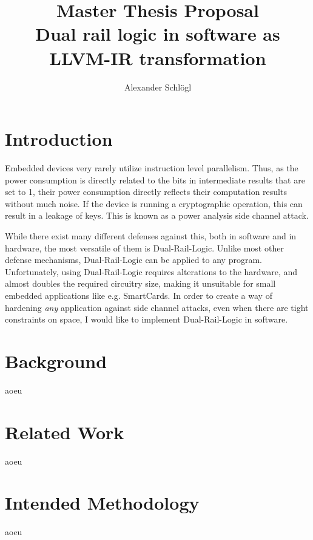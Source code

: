 \documentclass{article}
\title{%
  Master Thesis Proposal\\
  \large Dual rail logic in software as LLVM-IR transformation}
\author{Alexander Schl\"ogl}
\begin{document}
\maketitle

\section{Introduction}
Embedded devices very rarely utilize instruction level parallelism.
Thus, as the power consumption is directly related to the bits in intermediate results that are set to 1, their power consumption directly reflects their computation results without much noise.
If the device is running a cryptographic operation, this can result in a leakage of keys.
This is known as a power analysis side channel attack. \cite{kocher1999differential}

While there exist many different defenses against this, both in software and in hardware, the most versatile of them is Dual-Rail-Logic. \cite{sokolov2005design}
Unlike most other defense mechanisms, Dual-Rail-Logic can be applied to any program.
Unfortunately, using Dual-Rail-Logic requires alterations to the hardware, and almost doubles the required circuitry size, making it unsuitable for small embedded applications like e.g. SmartCards.
In order to create a way of hardening \emph{any} application against side channel attacks, even when there are tight constraints on space, I would like to implement Dual-Rail-Logic in software.

\section{Background}
\label{sec:background}
aoeu

\section{Related Work}
\label{sec:related-work}
aoeu

\section{Intended Methodology}
\label{sec:intended-methodology}
aoeu



\end{document}
